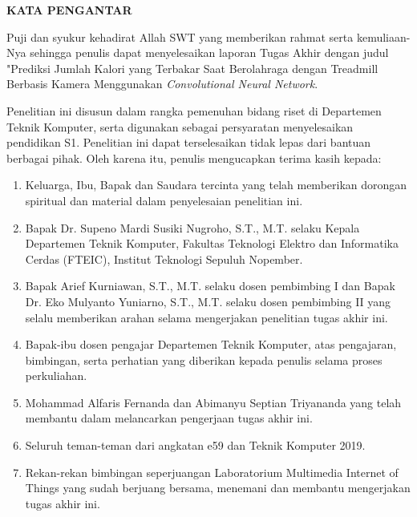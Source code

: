 \begin{center}
  \Large
  \textbf{KATA PENGANTAR}
\end{center}


\vspace{2ex}


Puji dan syukur kehadirat Allah SWT yang memberikan rahmat serta kemuliaan-Nya sehingga penulis dapat menyelesaikan laporan Tugas Akhir dengan judul "Prediksi Jumlah Kalori yang Terbakar Saat Berolahraga dengan Treadmill Berbasis Kamera Menggunakan \emph{Convolutional Neural Network}.

Penelitian ini disusun dalam rangka pemenuhan bidang riset di Departemen Teknik Komputer, serta digunakan sebagai persyaratan menyelesaikan pendidikan S1. Penelitian ini dapat terselesaikan tidak lepas dari bantuan berbagai pihak. Oleh karena itu, penulis mengucapkan terima kasih kepada:

\begin{enumerate}[nolistsep]

  \item Keluarga, Ibu, Bapak dan Saudara tercinta yang telah memberikan dorongan spiritual dan material dalam penyelesaian penelitian ini.

  \item Bapak Dr. Supeno Mardi Susiki Nugroho, S.T., M.T. selaku Kepala Departemen Teknik Komputer, Fakultas Teknologi Elektro dan Informatika Cerdas (FTEIC), Institut Teknologi Sepuluh Nopember.

  \item Bapak Arief Kurniawan, S.T., M.T. selaku dosen pembimbing I dan Bapak Dr. Eko Mulyanto Yuniarno, S.T., M.T. selaku dosen pembimbing II yang selalu memberikan arahan selama mengerjakan penelitian tugas akhir ini.

  \item Bapak-ibu dosen pengajar Departemen Teknik Komputer, atas pengajaran, bimbingan, serta perhatian yang diberikan kepada penulis selama proses perkuliahan.
  
  \item Mohammad Alfaris Fernanda dan Abimanyu Septian Triyananda yang telah membantu dalam melancarkan pengerjaan tugas akhir ini.

  \item Seluruh teman-teman dari angkatan e59 dan Teknik Komputer 2019.

  \item Rekan-rekan bimbingan seperjuangan Laboratorium Multimedia Internet of Things yang sudah berjuang bersama, menemani dan membantu mengerjakan tugas akhir ini.

\end{enumerate}

